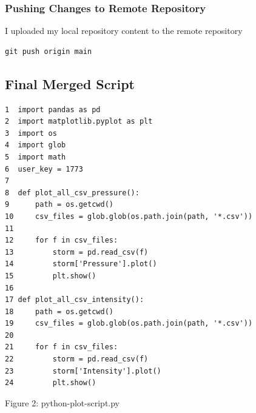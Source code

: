 \documentclass[]{article}
\begin{document}
\subsubsection{Pushing Changes to Remote Repository}
I uploaded my local repository content to the remote repository 
\begin{tcolorbox}[colback=white, colframe=black, boxrule=1pt,
    fonttitle=\bfseries, listing only, listing options={language=sh, basicstyle=\ttfamily}]
\begin{verbatim}
git push origin main
\end{verbatim}
\end{tcolorbox}

\subsection{Final Merged Script}
\begin{tcolorbox}[colback=white, colframe=black, boxrule=1pt,
    title=python-plot-script.py, fonttitle=\bfseries, listing only, listing options={language=sh, basicstyle=\ttfamily}]
\begin{verbatim}
1  import pandas as pd
2  import matplotlib.pyplot as plt
3  import os
4  import glob
5  import math
6  user_key = 1773
7   
8  def plot_all_csv_pressure():
9      path = os.getcwd()
10     csv_files = glob.glob(os.path.join(path, '*.csv'))
11        
12     for f in csv_files:
13         storm = pd.read_csv(f)
14         storm['Pressure'].plot()
15         plt.show()
16    
17 def plot_all_csv_intensity():
18     path = os.getcwd()
19     csv_files = glob.glob(os.path.join(path, '*.csv'))
20        
21     for f in csv_files:
22         storm = pd.read_csv(f)
23         storm['Intensity'].plot()
24         plt.show()
\end{verbatim}
\end{tcolorbox}
\begin{center}
    Figure 2: python-plot-script.py
\end{center}
\end{document}
